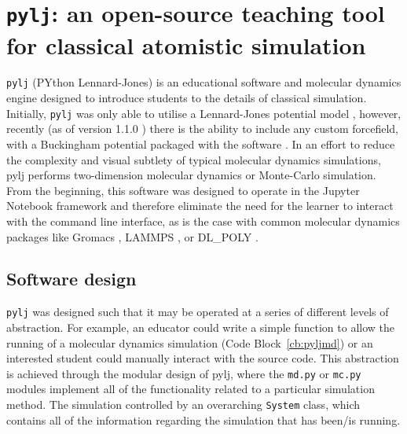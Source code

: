 \section{\texttt{pylj}: an open-source teaching tool for classical atomistic simulation}

\texttt{pylj} (PYthon Lennard-Jones) \cite{mccluskey_pylj_2018,mccluskey_arm61/pylj_2019-2} is an educational software and molecular dynamics engine designed to introduce students to the details of classical simulation.
Initially, \texttt{pylj} was only able to utilise a Lennard-Jones potential model \cite{lennard-jones_determination_1924}, however, recently (as of version 1.1.0 \cite{mccluskey_arm61/pylj_2018}) there is the ability to include any custom forcefield, with a Buckingham potential packaged with the software \cite{buckingham_classical_1938}.
In an effort to reduce the complexity and visual subtlety of typical molecular dynamics simulations, pylj performs two-dimension molecular dynamics or Monte-Carlo simulation.
From the beginning, this software was designed to operate in the Jupyter Notebook framework and therefore eliminate the need for the learner to interact with the command line interface, as is the case with common molecular dynamics packages like Gromacs \cite{berendsen_gromacs_1995}, LAMMPS \cite{plimpton_fast_1995}, or DL\_POLY \cite{smith_dl_poly_2002}.

\subsection{Software design}
\texttt{pylj} was designed such that it may be operated at a series of different levels of abstraction.
For example, an educator could write a simple function to allow the running of a molecular dynamics simulation (Code Block~\ref{cb:pyljmd}) or an interested student could manually interact with the source code.
This abstraction is achieved through the modular design of pylj, where the \texttt{md.py} or \texttt{mc.py} modules implement all of the functionality related to a particular simulation method.
The simulation controlled by an overarching \texttt{System} class, which contains all of the information regarding the simulation that has been/is running.
%
\begin{figure}
    \centering
        
\end{figure}
%

